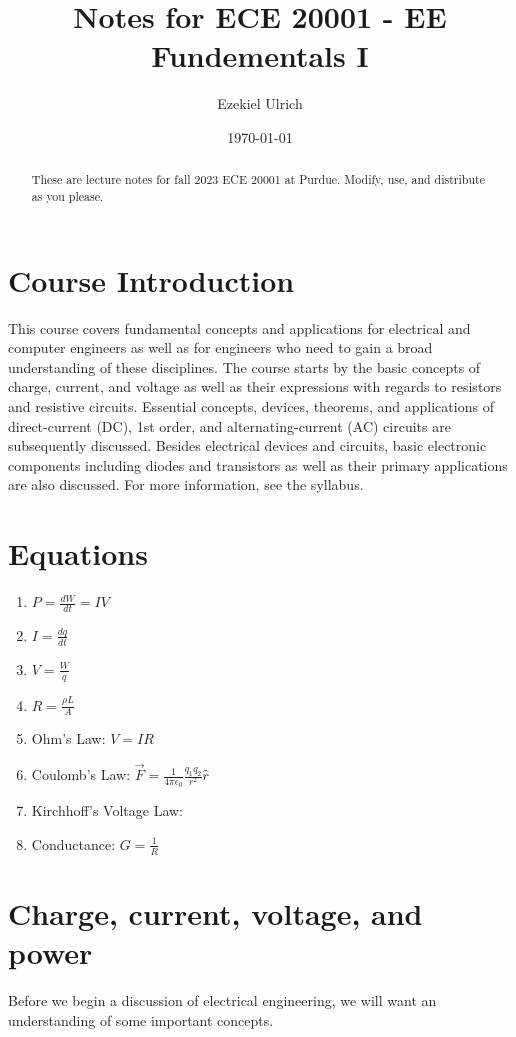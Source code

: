 \documentclass[nobib]{tufte-handout}
\title{Notes for ECE 20001 - EE Fundementals I}
\author[Ezekiel Ulrich]{Ezekiel Ulrich}
\date{\today}  %
\begin{document}
\maketitle

\begin{abstract}
These are lecture notes for fall 2023 ECE 20001 at Purdue. Modify, use, and distribute as you please.
\end{abstract}

\tableofcontents

\section{Course Introduction}

This course covers fundamental concepts and applications 
for electrical and computer engineers as well as for engineers
 who need to gain a broad understanding of these disciplines. 
 The course starts by the basic concepts of charge, current, 
 and voltage as well as their expressions with regards to 
 resistors and resistive circuits. Essential concepts, 
 devices, theorems, and applications of direct-current (DC), 
 1st order, and alternating-current (AC) circuits are 
 subsequently discussed. Besides electrical devices and 
 circuits, basic electronic components including diodes and 
 transistors as well as their primary applications are also 
 discussed. For more information, see the syllabus. 

\section{Equations}

\begin{enumerate}
    \item $P = \frac{dW}{dt} = IV$
    \item $I = \frac{dq}{dt}$
    \item $V = \frac{W}{q}$
    \item $R = \frac{\rho L}{A}$
    \item Ohm's Law: $V=IR$
    \item Coulomb's Law: $\vec{F} = \frac{1}{4\pi \epsilon_0}\frac{q_1 q_2}{r^2}\hat{r}$
    \item Kirchhoff's Voltage Law: 
    \item Conductance: $G = \frac{1}{R}$
\end{enumerate}

\pagebreak

\section{Charge, current, voltage, and power}
Before we begin a discussion
of electrical engineering, we will want an
understanding of some important concepts. 
\end{document}
